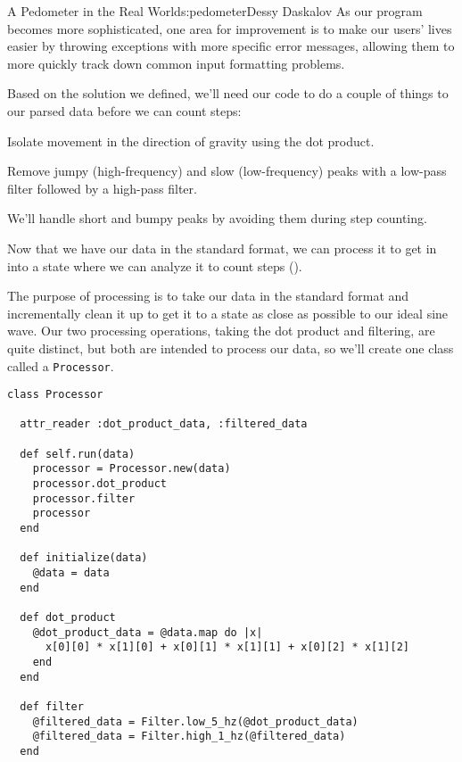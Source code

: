 \begin{aosachapter}{A Pedometer in the Real World}{s:pedometer}{Dessy Daskalov}
As our program becomes more sophisticated, one area for improvement is
to make our users' lives easier by throwing exceptions with more
specific error messages, allowing them to more quickly track down common
input formatting problems.

\label{processing}

Based on the solution we defined, we'll need our code to do a couple of
things to our parsed data before we can count steps:

\begin{aosaenumerate}
\def\labelenumi{\arabic{enumi}.}

\item
  Isolate movement in the direction of gravity using the dot product.
\item
  Remove jumpy (high-frequency) and slow (low-frequency) peaks with a
  low-pass filter followed by a high-pass filter.
\end{aosaenumerate}

We'll handle short and bumpy peaks by avoiding them during step
counting.

Now that we have our data in the standard format, we can process it to
get in into a state where we can analyze it to count steps
().


The purpose of processing is to take our data in the standard format and
incrementally clean it up to get it to a state as close as possible to
our ideal sine wave. Our two processing operations, taking the dot
product and filtering, are quite distinct, but both are intended to
process our data, so we'll create one class called a \texttt{Processor}.

\begin{verbatim}
class Processor

  attr_reader :dot_product_data, :filtered_data

  def self.run(data)
    processor = Processor.new(data)
    processor.dot_product
    processor.filter
    processor
  end

  def initialize(data)
    @data = data
  end

  def dot_product
    @dot_product_data = @data.map do |x|
      x[0][0] * x[1][0] + x[0][1] * x[1][1] + x[0][2] * x[1][2]
    end
  end

  def filter
    @filtered_data = Filter.low_5_hz(@dot_product_data)
    @filtered_data = Filter.high_1_hz(@filtered_data)
  end


\end{verbatim}
\end{aosachapter}
